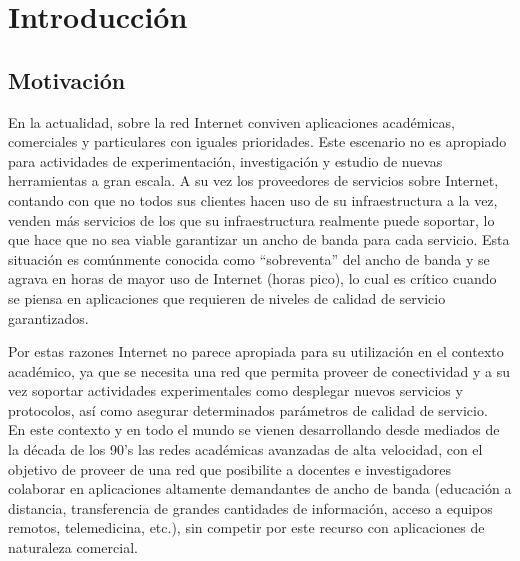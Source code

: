 
\chapter{Introducci\'on}

\ifpdf
    \graphicspath{{Chapter1/Figs/Raster/}{Chapter1/Figs/PDF/}{Chapter2/Figs/}}
\else
    \graphicspath{{Chapter1/Figs/Vector/}{Chapter1/Figs/}}
\fi


\section{Motivación}

En la actualidad, sobre la red Internet conviven aplicaciones académicas, comerciales y particulares con iguales prioridades. Este escenario no es apropiado para actividades de experimentación, investigación y estudio de nuevas herramientas a gran escala. A su vez los proveedores de servicios sobre Internet, contando con que no todos sus clientes hacen uso de su infraestructura a la vez, venden m\'as servicios de los que su infraestructura realmente puede soportar, lo que hace que no sea viable garantizar un ancho de banda para cada servicio. Esta situación es comúnmente conocida como “sobreventa” del ancho de banda y se agrava en horas de mayor uso de Internet (horas pico), lo cual es crítico cuando se piensa en aplicaciones que requieren de niveles de calidad de servicio garantizados.

Por estas razones Internet no parece apropiada para su utilización en el contexto académico, ya que se necesita una red que permita proveer de conectividad y a su vez soportar actividades experimentales como desplegar nuevos servicios y protocolos, así como asegurar determinados parámetros de calidad de servicio.\\ 

En este contexto y en todo el mundo se vienen desarrollando desde mediados de la década de los 90’s las redes académicas avanzadas de alta velocidad, con el objetivo de proveer de una red que posibilite a docentes e investigadores colaborar en aplicaciones altamente demandantes de ancho de banda   
 (educación a distancia, transferencia de grandes cantidades de información, acceso a equipos remotos, telemedicina, etc.), sin competir por este recurso con aplicaciones de naturaleza comercial.

